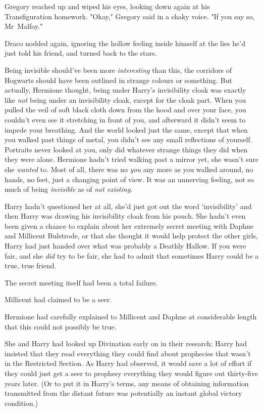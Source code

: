 Gregory reached up and wiped his eyes, looking down again at his
Transfiguration homework. "Okay," Gregory said in a shaky voice. "If you say
so, Mr~Malfoy."

Draco nodded again, ignoring the hollow feeling inside himself at the lies he'd
just told his friend, and turned back to the stars.

Being invisible should've been more \emph{interesting} than this, the corridors
of Hogwarts should have been outlined in strange colours or something. But
actually, Hermione thought, being under Harry's invisibility cloak was exactly
like \emph{not} being under an invisibility cloak, except for the cloak part.
When you pulled the veil of soft black cloth down from the hood and over your
face, you couldn't even see it stretching in front of you, and afterward it
didn't seem to impede your breathing. And the world looked just the same,
except that when you walked past things of metal, you didn't see any small
reflections of yourself. Portraits never looked at you, only did whatever
strange things they did when they were alone. Hermione hadn't tried walking
past a mirror yet, she wasn't sure she \emph{wanted} to. Most of all, there was
no \emph{you} any more as you walked around, no hands, no feet, just a changing
point of view. It was an unnerving feeling, not so much of being
\emph{invisible} as of \emph{not existing.}

Harry hadn't questioned her at all, she'd just got out the word `invisibility'
and then Harry was drawing his invisibility cloak from his pouch. She hadn't
even been given a chance to explain about her extremely secret meeting with
Daphne and Millicent Bulstrode, or that she thought it would help protect the
other girls, Harry had just handed over what was probably a Deathly Hallow. If
you were fair, and she \emph{did} try to be fair, she had to admit that
sometimes Harry could be a true, true friend.

The secret meeting itself had been a total failure.

Millicent had claimed to be a seer.

Hermione had carefully explained to Millicent and Daphne at considerable length
that this could not possibly be true.

She and Harry had looked up Divination early on in their research; Harry had
insisted that they read everything they could find about prophecies that wasn't
in the Restricted Section. As Harry had observed, it would save a lot of effort
if they could just get a seer to prophesy everything they would figure out
thirty-five years later. (Or to put it in Harry's terms, any means of obtaining
information transmitted from the distant future was potentially an instant
global victory condition.)

